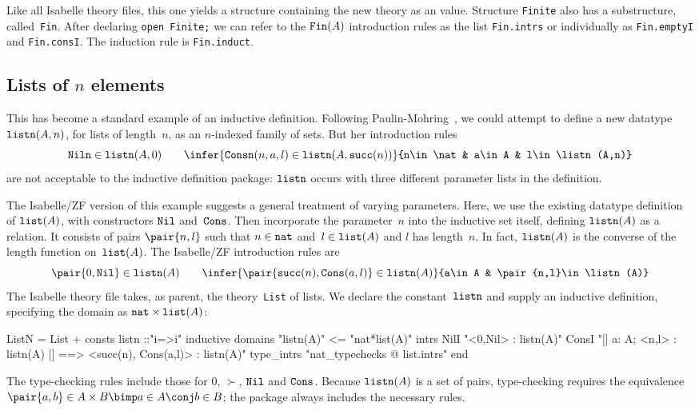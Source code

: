 Like all Isabelle theory files, this one yields a structure containing the
new theory as an \ML{} value.  Structure {\tt Finite} also has a
substructure, called~{\tt Fin}.  After declaring \hbox{\tt open Finite;} we
can refer to the $\hbox{\tt Fin}(A)$ introduction rules as the list {\tt Fin.intrs}
or individually as {\tt Fin.emptyI} and {\tt Fin.consI}.  The induction
rule is {\tt Fin.induct}.


\subsection{Lists of $n$ elements}\label{listn-sec}
This has become a standard example of an inductive definition.  Following
Paulin-Mohring~\cite{paulin92}, we could attempt to define a new datatype
$\hbox{\tt listn}(A,n)$, for lists of length~$n$, as an $n$-indexed family of sets.
But her introduction rules
\[ \hbox{\tt Niln}\in\listn(A,0)  \qquad
   \infer{\hbox{\tt Consn}(n,a,l)\in\listn(A,\succ(n))}
         {n\in\nat & a\in A & l\in\listn(A,n)}
\]
are not acceptable to the inductive definition package:
$\hbox{\tt listn}$ occurs with three different parameter lists in the definition.

The Isabelle/ZF version of this example suggests a general treatment of
varying parameters.  Here, we use the existing datatype definition of
$\hbox{\tt list}(A)$, with constructors $\hbox{\tt Nil}$ and~$\hbox{\tt Cons}$.  Then incorporate the
parameter~$n$ into the inductive set itself, defining $\hbox{\tt listn}(A)$ as a
relation.  It consists of pairs $\pair{n,l}$ such that $n\in\hbox{\tt nat}$
and~$l\in\hbox{\tt list}(A)$ and $l$ has length~$n$.  In fact, $\hbox{\tt listn}(A)$ is the
converse of the length function on~$\hbox{\tt list}(A)$.  The Isabelle/ZF introduction
rules are
\[ \pair{0,\Nil}\in\listn(A)  \qquad
   \infer{\pair{\succ(n),\Cons(a,l)}\in\listn(A)}
         {a\in A & \pair{n,l}\in\listn(A)}
\]
The Isabelle theory file takes, as parent, the theory~{\tt List} of lists.
We declare the constant~$\hbox{\tt listn}$ and supply an inductive definition,
specifying the domain as $\hbox{\tt nat}\times\hbox{\tt list}(A)$:
\begin{ttbox}
ListN = List +
consts  listn ::"i=>i"
inductive
  domains   "listn(A)" <= "nat*list(A)"
  intrs
    NilI  "<0,Nil> : listn(A)"
    ConsI "[| a: A;  <n,l> : listn(A) |] ==> <succ(n), Cons(a,l)> : listn(A)"
  type_intrs "nat_typechecks @ list.intrs"
end
\end{ttbox}
The type-checking rules include those for 0, $\succ$, $\hbox{\tt Nil}$ and $\hbox{\tt Cons}$.
Because $\hbox{\tt listn}(A)$ is a set of pairs, type-checking requires the
equivalence $\pair{a,b}\in A\times B \bimp a\in A \conj b\in B$; the
package always includes the necessary rules.

